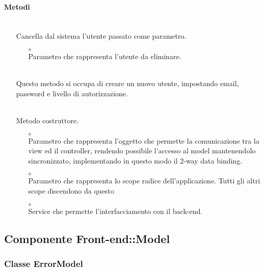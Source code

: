 \paragraph*{Metodi}
\begin{itemize}
\item[]  \\ Cancella dal sistema l'utente passato come parametro.
\begin{itemize}\addtolength{\itemsep}{-0.5\baselineskip}
\item[$\circ$]  \\ Parametro che rappresenta l'utente da eliminare.
\end{itemize}
\item[]  \\ Questo metodo si occupa di creare un nuovo utente, impostando email, password e livello di autorizzazione.
\item[]  \\ Metodo costruttore. 
\begin{itemize}\addtolength{\itemsep}{-0.5\baselineskip}
\item[$\circ$]  \\ Parametro che rappresenta l'oggetto che permette la comunicazione tra la view ed il controller, rendendo possibile l’accesso al model mantenendolo sincronizzato, implementando in questo modo il 2-way data binding.
\item[$\circ$]  \\ Parametro che rappresenta lo scope radice dell'applicazione. Tutti gli altri scope discendono da questo
\item[$\circ$]  \\ Service che permette l'interfacciamento con il back-end.
\end{itemize}
\end{itemize}

\subsection{Componente Front-end::Model}

\subsubsection{Classe ErrorModel}

